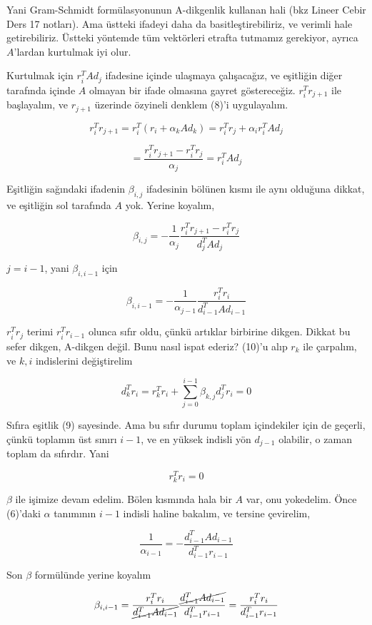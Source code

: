 \documentclass[12pt,fleqn]{article}\usepackage{../../common}
\begin{document}
Yani Gram-Schmidt formülasyonunun A-dikgenlik kullanan hali (bkz Lineer
Cebir Ders 17 notları). Ama üstteki ifadeyi daha da basitleştirebiliriz, ve
verimli hale getirebiliriz. Üstteki yöntemde tüm vektörleri etrafta
tutmamız gerekiyor, ayrıca $A$'lardan kurtulmak iyi olur. 

Kurtulmak için $r_i^TAd_j$ ifadesine içinde ulaşmaya çalışacağız, ve
eşitliğin diğer tarafında içinde $A$ olmayan bir ifade olmasına gayret
göstereceğiz. $r_i^Tr_{j+1}$ ile başlayalım, ve $r_{j+1}$ üzerinde özyineli
denklem (8)'i uygulayalım. 

$$ r_i^Tr_{j+1} = r_i^T (r_i + \alpha_k A d_k)  = r_i^Tr_j + \alpha_i r_i^TAd_j $$

$$ = \frac{ r_i^Tr_{j+1} - r_i^Tr_j }{\alpha_j} =  r_i^TAd_j $$

Eşitliğin sağındaki ifadenin $\beta_{i,j}$ ifadesinin bölünen kısmı ile
aynı olduğuna dikkat, ve eşitliğin sol tarafında $A$ yok. Yerine koyalım, 

$$ \beta_{i,j} = - \frac{ 1}{\alpha_j}\frac{  r_i^Tr_{j+1} - r_i^Tr_j }{d_j^TAd_j} $$

$j = i -1$, yani $\beta_{i,i-1}$ için

$$ \beta_{i,i-1} = - \frac{ 1}{\alpha_{j-1}}\frac{  r_i^Tr_i  }{d_{i-1}^TAd_{i-1}} $$

$r_i^Tr_j$ terimi $r_i^Tr_{i-1}$ olunca sıfır oldu, çünkü artıklar
birbirine dikgen.  Dikkat bu sefer dikgen, A-dikgen değil. Bunu
nasıl ispat ederiz?  (10)'u alıp $r_k$ ile çarpalım, ve $k,i$ indislerini
değiştirelim

$$ d_k^Tr_i = r_k^Tr_i + \sum _{ j=0}^{i-1} \beta_{k,j}d_j ^Tr_i = 0
$$

Sıfıra eşitlik (9) sayesinde. Ama bu sıfır durumu toplam içindekiler için
de geçerli, çünkü toplamın üst sınırı $i-1$, ve en yüksek indisli yön
$d_{j-1}$ olabilir, o zaman toplam da sıfırdır. Yani

$$  r_k^Tr_i  = 0 $$

$\beta$ ile işimize devam edelim. Bölen kısmında hala bir $A$ var, onu
yokedelim. Önce (6)'daki $\alpha$ tanımının $i-1$ indisli haline bakalım, ve
tersine çevirelim, 

$$ \frac{ 1}{\alpha_{i-1}} = -\frac{d_{i-1}^T A d_{i-1} }{d_{i-1}^Tr_{i-1}} 
$$

Son $\beta$ formülünde yerine koyalım

$$ \beta_{i,i-1} = 
\frac{  r_i^Tr_i  }{ \cancel{d_{i-1}^TAd_{i-1}}} 
\frac{\cancel{d_{i-1}^T A d_{i-1}}}{d_{i-1}^Tr_{i-1}}
= 
\frac{  r_i^Tr_i  }{d_{i-1}^Tr_{i-1}}
$$
\end{document}
